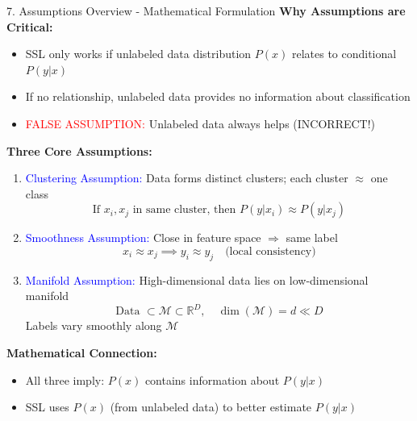 \documentclass[8pt]{beamer}
\begin{document}
	\begin{frame}{7. Assumptions Overview - Mathematical Formulation}
		\fontsize{6.5}{7.5}\selectfont
		\textbf{Why Assumptions are Critical:}
		\begin{itemize}
			\item SSL only works if unlabeled data distribution $P(x)$ relates to conditional $P(y|x)$
			\item If no relationship, unlabeled data provides no information about classification
			\item \textcolor{red}{FALSE ASSUMPTION:} Unlabeled data always helps (INCORRECT!)
		\end{itemize}
		
		\textbf{Three Core Assumptions:}
		
		\begin{enumerate}
			\item \textcolor{blue}{Clustering Assumption:} Data forms distinct clusters; each cluster $\approx$ one class
			\[
			\text{If } x_i, x_j \text{ in same cluster, then } P(y|x_i) \approx P(y|x_j)
			\]
			
			\item \textcolor{blue}{Smoothness Assumption:} Close in feature space $\Rightarrow$ same label
			\[
			x_i \approx x_j \implies y_i \approx y_j \quad \text{(local consistency)}
			\]
			
			\item \textcolor{blue}{Manifold Assumption:} High-dimensional data lies on low-dimensional manifold
			\[
			\text{Data } \subset \mathcal{M} \subset \mathbb{R}^D, \quad \dim(\mathcal{M}) = d \ll D
			\]
			Labels vary smoothly along $\mathcal{M}$
		\end{enumerate}
		
		\textbf{Mathematical Connection:}
		\begin{itemize}
			\item All three imply: $P(x)$ contains information about $P(y|x)$
			\item SSL uses $P(x)$ (from unlabeled data) to better estimate $P(y|x)$
		\end{itemize}
	\end{frame}
	
\end{document}
